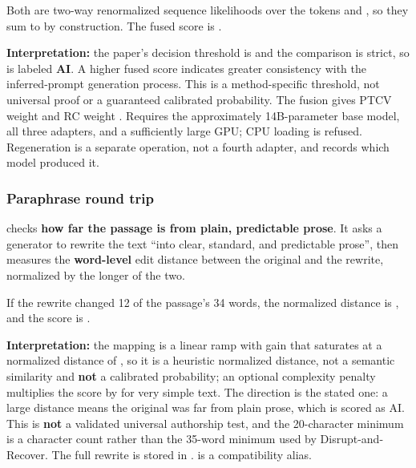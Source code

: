 Both are two-way renormalized sequence likelihoods over the tokens
\texttt{} and \texttt{}, so they sum to
\texttt{} by construction. The fused score is
\texttt{}.

\textbf{Interpretation:} the paper's decision threshold is
\texttt{} and the comparison is strict, so
\texttt{} is labeled \textbf{AI}. A higher fused score
indicates greater consistency with the inferred-prompt generation
process. This is a method-specific threshold, not universal proof or a
guaranteed calibrated probability. The fusion gives PTCV weight
\texttt{} and RC weight \texttt{}.
Requires the approximately 14B-parameter base model, all three adapters,
and a sufficiently large GPU; CPU loading is refused. Regeneration is a
separate operation, not a fourth adapter, and
\texttt{} records which model
produced it.

\subsubsection{Paraphrase round
trip}\label{record-DETECTORS-md-paraphrase-round-trip}

\texttt{} checks \textbf{how far
the passage is from plain, predictable prose}. It asks a generator to
rewrite the text ``into clear, standard, and predictable prose'', then
measures the \textbf{word-level} edit distance between the original and
the rewrite, normalized by the longer of the two.

If the rewrite changed 12 of the passage's 34 words, the normalized
distance is \texttt{}, and the score is
\texttt{}.

\textbf{Interpretation:} the mapping is a linear ramp with gain
\texttt{} that saturates at a normalized distance of
\texttt{}, so it is a heuristic normalized distance, not
a semantic similarity and \textbf{not} a calibrated probability; an
optional complexity penalty multiplies the score by
\texttt{} for very simple text. The direction is the
stated one: a large distance means the original was far from plain
prose, which is scored as AI. This is \textbf{not} a validated universal
authorship test, and the 20-character minimum is a character count
rather than the 35-word minimum used by Disrupt-and-Recover. The full
rewrite is stored in \texttt{}.
\texttt{} is a compatibility alias.

